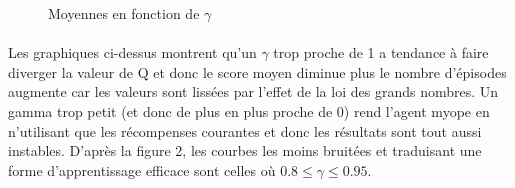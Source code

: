 \documentclass[12pt,oneside,a4paper]{article}
\begin{document}
\begin{figure}[hbt!]
{        }
        \hspace{0mm}
        \caption{Moyennes en fonction de $\gamma$}
    \end{figure}

    

    \paragraph{}
    Les graphiques ci-dessus montrent qu'un $\gamma$ trop proche de 1 a tendance à faire diverger la
    valeur de $\mathrm{Q}$ et donc le score moyen diminue plus le nombre d'épisodes augmente car les valeurs sont lissées
    par l'effet de la loi des grands nombres. Un gamma trop petit (et donc de plus en plus proche de 0)
    rend l'agent myope en n'utilisant que les récompenses courantes et donc les résultats sont tout aussi instables. D'après la figure 2,
    les courbes les moins bruitées et traduisant une forme d'apprentissage efficace sont celles où
    $0.8 \leq \gamma \leq 0.95$.
    \newpage
\end{document}
